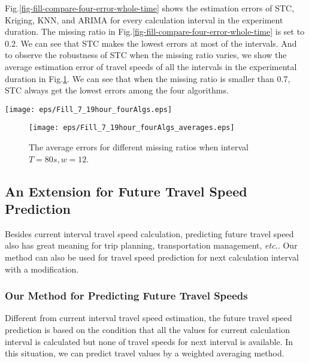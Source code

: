 \documentclass[twocolumn,10pt,final,conference]{IEEEtran}
\def\etc{\textit{etc.}\xspace}
\begin{document}
Fig.\ref{fig-fill-compare-four-error-whole-time} shows the estimation errors of STC, Kriging, KNN, and ARIMA for every calculation interval in the experiment duration. The missing ratio in Fig.\ref{fig-fill-compare-four-error-whole-time} is set  to 0.2.  We can see that STC makes the lowest errors at most of the intervals.
And to observe the robustness of STC when the missing ratio varies, we show the average estimation error of travel speeds of all the intervals in the experimental duration in Fig.\ref{fig-fill-compare-four-error-fill-average}.  We can see that when the missing ratio is smaller than 0.7, STC always get the lowest errors among the four algorithms.
\begin{figure*}[t]
  \centering
  \texttt{[image: eps/Fill\_7\_19hour\_fourAlgs.eps]}\\
  \caption{The comparison of filling-up errors among four estimation methods during 7:00-16:00 April 24th, 2011. The missing ratio is 0.2. And $T=80s, w=12$.}
  \label{fig-fill-compare-four-error-whole-time}
\end{figure*}

\begin{figure}[h]
  \centering
\texttt{[image: eps/Fill\_7\_19hour\_fourAlgs\_averages.eps]}\\
  \caption{The average errors for different missing ratios when interval $T=80s, w=12$.}
  \label{fig-fill-compare-four-error-fill-average}
\end{figure}



\subsection{An Extension for Future Travel Speed Prediction}
Besides current interval travel speed calculation, predicting future travel speed  also has great meaning for trip planning, transportation management, \etc. Our method can also be used for travel speed prediction for next calculation interval with a modification.
\subsubsection{Our Method for Predicting Future Travel Speeds}\label{section-Predicting Global Future Travel Speed}
\quad
Different from current interval travel speed estimation, the future travel speed prediction is based on the condition that all the values for current calculation interval is calculated but none of travel speeds for next interval is available. In this situation, we can predict travel values by a weighted averaging method.
\end{document}
